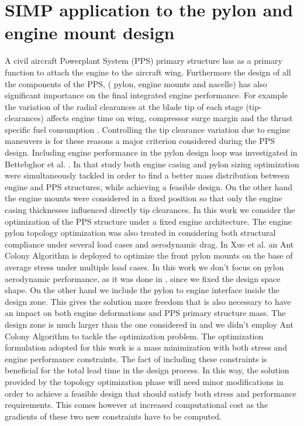 \section{SIMP application to the pylon and engine mount design}
\label{SIMP_application}
A civil aircraft Powerplant System (PPS) primary structure has as a primary function to attach the engine to the aircraft wing. Furthermore the design of all the components of the PPS, ( pylon, engine mounts and nacelle) has also significant importance on the final integrated engine performance.
For example the variation of the radial clearances at the blade tip of each stage (tip-clearances) affects engine time on wing, compressor surge margin and the thrust specific fuel consumption \cite{lattime2002turbine,benito20083d}. Controlling the tip clearance variation due to engine maneuvers is for these reasons a major criterion considered during the PPS design. Including engine performance in the pylon design loop was investigated in Bettebghor et al. \cite{bettebghor2013bi}. In that study both engine casing and pylon sizing optimization were simultaneously tackled in order to find a better mass distribution between engine and PPS structures, while achieving a feasible design. On the other hand the engine mounts were considered in a fixed position so that only the engine casing thicknesses influenced directly tip clearances.
In this work we consider the optimization of the PPS structure under a fixed engine architecture.
 The engine pylon topology optimization was also treated in \cite{remouchamps2011application} considering both structural compliance under several load cases and aerodynamic drag.
 In Xue et al. \cite{xue2012structural} an Ant Colony Algorithm is deployed to optimize the front pylon mounts on the base of average stress under multiple load cases.
 In this work we don't focus on pylon aerodynamic performance, as it was done in \cite{remouchamps2011application}, since we fixed the design space shape. On the other hand we include the pylon to engine interface inside the design zone. This gives the solution more freedom that is also necessary to have an impact on both engine deformations and PPS primary structure mass. The design zone is much larger than the one considered in \cite{xue2012structural} and we didn't employ Ant Colony Algorithm to tackle the optimization problem.
 The optimization formulation adopted for this work is a mass minimization with both stress and engine performance constraints. The fact of including these constraints is beneficial for the total lead time in the design process. In this way, the solution provided by the topology optimization phase will need minor modifications in order to achieve a feasible design that should satisfy both stress and performance requirements. This comes however at increased computational cost as the gradients of these two new constraints have to be computed.\\
